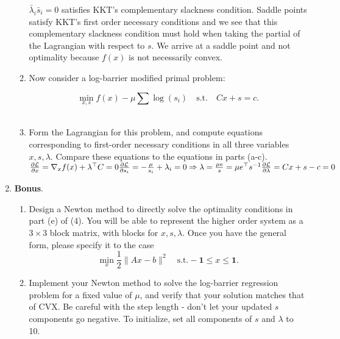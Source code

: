 \documentclass[12pt]{amsart}
\newcommand{\grad}{\nabla}
\begin{document}
\begin{enumerate}
\begin{enumerate}
$\bar \lambda_i \bar s_i = 0 $ satisfies KKT's complementary slackness condition.  Saddle points satisfy KKT's first order necessary conditions and we see that this complementary slackness condition must hold when taking the partial of the Lagrangian with respect to $s$.  We arrive at a saddle point and not optimality because $f(x)$ is not necessarily convex. \\

\item Now consider a log-barrier modified primal problem: 

\[
\min_{x,s} f(x)  - \mu\sum \log(s_i) \quad \text{s.t.} \quad Cx +s =c.
\]
\\
\item Form the Lagrangian for this problem, and compute equations corresponding to first-order necessary conditions in all three variables $x, s, \lambda$. 
Compare these equations to the equations in parts (a-c). \\

$\frac{\partial \mathcal{L}}{\partial x} = \grad_x f(x) + \lambda^\top C = 0 \\
\frac{\partial \mathcal{L}}{\partial s_i} = -\frac{\mu}{s_i} + \lambda_i = 0 \Rightarrow \lambda = \frac{\mu e}{s} = \mu e^\top s^{-1} \\
\frac{\partial \mathcal{L}}{\partial \lambda} = Cx + s - c = 0 \\
$



\end{enumerate}
\newpage
\item {\bf Bonus}. 

\begin{enumerate}
\item
Design a Newton method to directly solve the optimality conditions in part (e) of (4). You will be able to represent the higher order system
as a $3 \times 3$ block matrix, with blocks for $x, s, \lambda$.  Once you have the general form, please specify it to the case
\[
\min_x \frac{1}{2}\|Ax -b\|^2 \quad \text{s.t.} -\mathbf{1} \leq x \leq \mathbf{1}.
\]

\item Implement your Newton method to solve the log-barrier regression problem for a fixed value of $\mu$, and verify that your 
solution matches that of CVX. Be careful with the step length - don't let your updated $s$ components go negative. 
To initialize, set all components of $s$ and $\lambda$ to 10. \\


\end{enumerate}
\end{enumerate}
\end{document}
